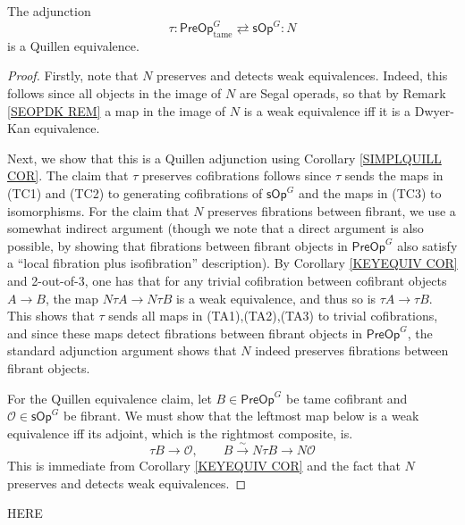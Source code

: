 \documentclass[a4paper,10pt
]{article}%
\renewcommand{\1}{\ensuremath{\mathbb{id}}}
\begin{document}
\begin{proposition}
The adjunction
\[
	\tau \colon \mathsf{PreOp}^G_{\text{tame}}
		\rightleftarrows 
	\mathsf{sOp}^G \colon N
\]
is a Quillen equivalence.
\end{proposition}


\begin{proof}
Firstly, note that $N$ preserves and detects weak equivalences.
Indeed, this follows since all objects in the image of $N$ are Segal operads, so that by Remark \ref{SEOPDK REM} a map in the image of $N$ is a weak equivalence iff it is a Dwyer-Kan equivalence.

Next, we show that this is a Quillen adjunction using Corollary \ref{SIMPLQUILL COR}.
The claim that $\tau$ preserves cofibrations follows since
$\tau$ sends the maps in (TC1) and (TC2) to generating cofibrations of $\mathsf{sOp}^G$ and the maps in (TC3) to isomorphisms.
For the claim that $N$ preserves fibrations between fibrant,
we use a somewhat indirect argument
(though we note that a direct argument is also possible,
by showing that fibrations between fibrant objects in $\mathsf{PreOp}^G$
also satisfy a ``local fibration plus isofibration'' description).
By Corollary \ref{KEYEQUIV COR} and 2-out-of-3, 
one has that for any trivial cofibration between cofibrant objects
$A \to B$, the map $N \tau A \to N \tau B$ is a weak equivalence, and thus so is $\tau A \to \tau B$.
This shows that $\tau$ sends all maps in (TA1),(TA2),(TA3)
to trivial cofibrations, and since these maps detect fibrations between fibrant objects in $\mathsf{PreOp}^G$, 
the standard adjunction argument shows that 
$N$ indeed preserves fibrations between fibrant objects.

For the Quillen equivalence claim, 
let $B \in \mathsf{PreOp}^G$ be tame cofibrant and
$\mathcal{O} \in \mathsf{sOp}^G$ be fibrant.
We must show that the leftmost map below is a weak equivalence iff its adjoint, which is the rightmost composite, is.
\[
	\tau B \to \mathcal{O},
\qquad
	B \xrightarrow{\sim} N \tau B \to N \mathcal{O}
\]
This is immediate from Corollary \ref{KEYEQUIV COR}
and the fact that $N$ preserves and detects weak equivalences.
\end{proof}

{\color{red} HERE}


{}




\end{document}
